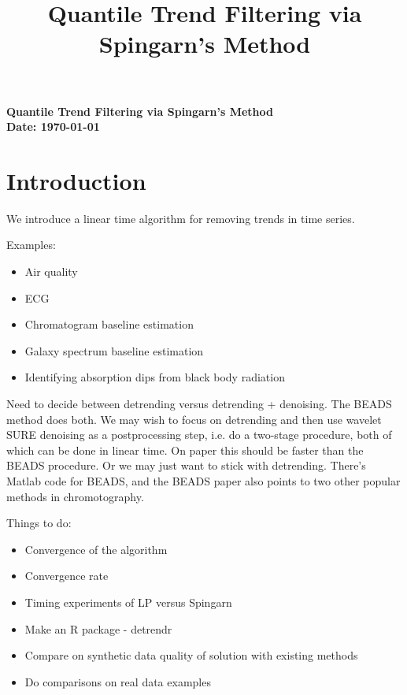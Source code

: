 \documentclass{article}
\begin{document}
\title{Quantile Trend Filtering via Spingarn's Method}
\noindent
\textbf{Quantile Trend Filtering via Spingarn's Method}\\
\textbf{Date: \today}\\

\section{Introduction}

We introduce a linear time algorithm for removing trends in time series.

Examples:
\begin{itemize}
\item Air quality 
\item ECG \cite{Sanyal2012}
\item Chromatogram baseline estimation  \cite{Ning2014, Ilewicz2015}
\item Galaxy spectrum baseline estimation \cite{Ilewicz2015,Bacher2016}
\item Identifying absorption dips from black body radiation
\end{itemize}

Need to decide between detrending versus detrending + denoising. The BEADS \cite{Ning2014} method does both. We may wish to focus on detrending and then use wavelet SURE denoising as a postprocessing step, i.e. do a two-stage procedure, both of which can be done in linear time. On paper this should be faster than the BEADS procedure. Or we may just want to stick with detrending.  There's Matlab code for BEADS, and the BEADS paper also points to two other popular methods in chromotography. 

Things to do:
\begin{itemize}
	\item Convergence of the algorithm
	\item Convergence rate \cite{He2012, He2015, Davis2017}
	\item Timing experiments of LP versus Spingarn
	\item Make an R package - detrendr
	\item Compare on synthetic data quality of solution with existing methods
	\item Do comparisons on real data examples
\end{itemize}
\end{document}
